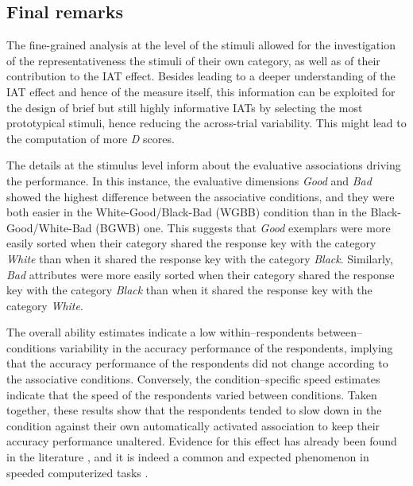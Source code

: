\documentclass[12pt]{book}
\begin{document}
\subsection{Final remarks}

The fine-grained analysis at the level of the stimuli allowed for the investigation of the representativeness the stimuli of their own category, as well as of their contribution to the IAT effect. 
Besides leading to a deeper understanding of the IAT effect and hence of the measure itself, this information can be exploited for the design of brief but still highly informative IATs by selecting the most prototypical stimuli, hence reducing the across-trial variability. This might lead to the computation of more \emph{D} scores.

The  details at the stimulus level inform about the evaluative associations driving the performance.
In this instance, the evaluative dimensions \emph{Good} and \emph{Bad} showed the highest difference between the associative conditions, and they were both easier in the White-Good/Black-Bad (WGBB) condition than in the Black-Good/White-Bad (BGWB) one. 
This suggests that  \emph{Good} exemplars were more easily sorted when their category shared the response key with the category \emph{White}  than when it shared the response key with the category \emph{Black}. 
Similarly, \emph{Bad} attributes were more easily sorted when their category shared the response key
with the category \emph{Black} than when it shared the response key with the category \emph{White}. 

The overall ability estimates indicate a low within--respondents between--conditions variability in the accuracy performance of the respondents, implying that the accuracy performance of the respondents did not change according to the associative conditions. 
	Conversely, the condition--specific speed estimates indicate that the speed of the respondents varied between conditions. 
	Taken together, these results show that the respondents tended to slow down in the condition against their own automatically activated association to keep their accuracy performance unaltered. 
	Evidence for this effect has already been found in the literature \cite<speed-accuracy trade-off,>{Klauer2007}, and it is indeed a common and expected phenomenon in speeded computerized tasks \cite{van2006, VanDerLinden2009}.
\end{document}
